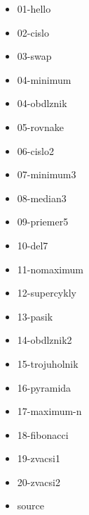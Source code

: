 



\begin{itemize}
\item 01-hello
\item 02-cislo
\item 03-swap
\item 04-minimum
\item 04-obdlznik
\item 05-rovnake
\item 06-cislo2
\item 07-minimum3
\item 08-median3
\item 09-priemer5
\item 10-del7
\item 11-nomaximum
\item 12-supercykly
\item 13-pasik
\item 14-obdlznik2
\item 15-trojuholnik
\item 16-pyramida
\item 17-maximum-n
\item 18-fibonacci
\item 19-zvacsi1
\item 20-zvacsi2
\item source
\end{itemize}

